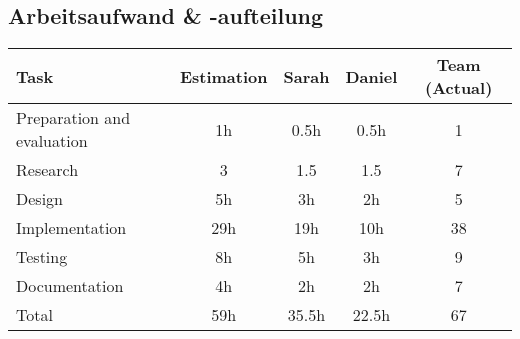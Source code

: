 \subsection{Arbeitsaufwand \& -aufteilung}
\begin{tabular} {| l | c | c | c | c |}
	\hline
	Task & Estimation & Sarah & Daniel & Team (Actual)	\\ \hline \hline
	Preparation and evaluation & 1h & 0.5h & 0.5h & 1		\\ \hline
	Research & 3 & 1.5 & 1.5 & 7		\\ \hline
	Design & 5h & 3h &	2h & 5			\\ \hline
	Implementation & 29h & 19h & 10h & 38 \\ \hline
	Testing & 8h & 5h & 3h & 9 \\ \hline
	Documentation	& 4h & 2h & 2h & 7	\\ \hline 
	Total	& 59h	& 35.5h & 22.5h & 67 \\
	\hline
\end{tabular}